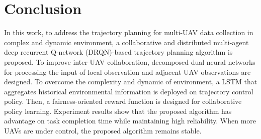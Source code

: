 \documentclass[journal]{IEEEtran}
\begin{document}
%		
%		
%		
%		

\section{Conclusion}\label{Conclusion}
In this work, to address the trajectory planning for multi-UAV data collection in complex and dynamic environment, a collaborative and distributed multi-agent deep recurrent Q-network (DRQN)-based trajectory planning algorithm is proposed. To improve inter-UAV collaboration, decomposed dual neural networks for processing the input of local observation and adjacent UAV observations are designed. To overcome the complexity and dynamic of environment, a LSTM that aggregates historical environmental information is deployed on trajectory control policy. Then, a fairness-oriented reward function is designed for collaborative policy learning. Experiment results show that the proposed algorithm has advantage on task completion time while maintaining high reliability. When more UAVs are under control, the proposed algorithm remains stable. 
\end{document}

